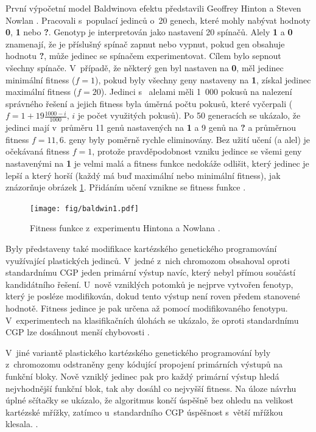 První výpočetní model Baldwinova efektu představili Geoffrey Hinton a Steven Nowlan \cite{HintonNowlan}. Pracovali s~populací jedinců o~20 genech, které mohly nabývat hodnoty \textbf{0}, \textbf{1} nebo \textbf{?}. Genotyp je interpretován jako nastavení 20 spínačů. Alely \textbf{1} a \textbf{0} znamenají, že je příslušný spínač zapnut nebo vypnut, pokud gen obsahuje hodnotu \textbf{?}, může jedinec se spínačem experimentovat. Cílem bylo sepnout všechny spínače. V~případě, že některý gen byl nastaven na \textbf{0}, měl jedinec minimální fitness ($f = 1$), pokud byly všechny geny nastaveny na \textbf{1}, získal jedinec maximální fitness ($f = 20$). Jedinci s~ alelami měli 1~000 pokusů na nalezení správného řešení a jejich fitness byla úměrná počtu pokusů, které vyčerpali ($f = 1 + 19 \frac{1000 - i}{1000}$, $i$ je počet využitých pokusů). Po 50 generacích se ukázalo, že jedinci mají v~průměru 11 genů nastavených na \textbf{1} a 9 genů na \textbf{?} a průměrnou fitness $f = 11,6$.  geny byly poměrně rychle eliminovány. Bez užití učení (a  alel) je očekávaná fitness $f = 1$, protože pravděpodobnost vzniku jedince se všemi geny nastavenými na \textbf{1} je velmi malá a fitness funkce nedokáže odlišit, který jedinec je lepší a který horší (každý má buď maximální nebo minimální fitness), jak znázorňuje obrázek \ref{obrHintonNowlan}. Přidáním učení vznikne se fitness funkce .

\begin{figure}[htb]
    \centering\texttt{[image: fig/baldwin1.pdf]}
    \caption{Fitness funkce z~experimentu Hintona a Nowlana \cite{HintonNowlan}.}
    \label{obrHintonNowlan}
\end{figure}

Byly představeny také modifikace kartézského genetického programování využívající plastických jedinců.
V~jedné z~nich chromozom obsahoval oproti standardnímu CGP jeden primární výstup navíc, který nebyl přímou součástí kandidátního řešení. U~nově vzniklých potomků je nejprve vytvořen fenotyp, který je posléze modifikován, dokud tento výstup není roven předem stanovené hodnotě. Fitness jedince je pak určena až pomocí modifikovaného fenotypu. V~experimentech na klasifikačních úlohách se ukázalo, že oproti standardnímu CGP lze dosáhnout menší chybovosti \cite{UllahPlasticCGP}.

V~jiné variantě plastického kartézského genetického programování byly z~chromozomu odstraněny geny kódující  propojení primárních výstupů na funkční bloky. Nově vzniklý jedinec pak pro každý primární výstup hledá nejvhodnější funkční blok, tak aby dosáhl co nejvyšší fitness. Na úloze návrhu úplné sčítačky se ukázalo, že algoritmus končí úspěšně bez ohledu na velikost kartézské mřížky, zatímco u~standardního CGP úspěšnost s~větší mřížkou klesala. \cite{KhatirPlasticCGP}.

